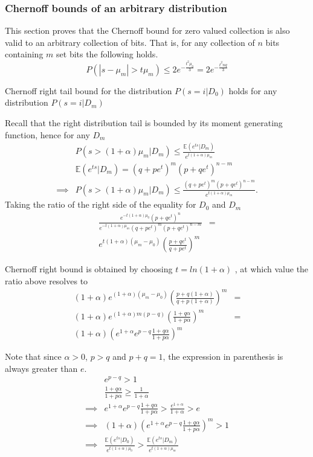 \documentclass[11pt]{article}
\newcommand{\E}{\mathbb{E}} %
\begin{document}
\subsubsection{Chernoff bounds of an arbitrary distribution }

This section proves that the Chernoff bound for zero valued collection is also valid to an arbitrary collection of bits.  That is, for any collection of $n$ bits containing $m$ set bits the following holds.
\[ P(|s - \mu_m| > t\mu_m) \le 2 e^{- \frac{t^2\mu_0}{3}}  = 2 e^{- \frac{t^2nq}{3}} \]

\begin{prop} \label{lem:zleft}
Chernoff right tail bound for the distribution $P(s=i|D_0)$ holds for any distribution $P(s=i|D_m)$
\begin{pf}
Recall that the right distribution tail is bounded by its moment generating function, hence for any $D_m$
 \begin{align}
& P(s  > (1+\alpha)\mu_m | D_m)  \le \frac{\E(e^{ts}|D_m)}{e^{t(1+\alpha)\mu_m}} \\
 & \E(e^{ts}|D_m) = (q +pe^{t})^m(p+qe^{t})^{n-m} \\
 \implies & P(s  > (1+\alpha)\mu_m | D_m)  \le \frac{ (q +pe^{t})^m(p+qe^{t})^{n-m}}{e^{t(1+\alpha)\mu_m}}. \label{eq:cbd}
 \end{align}
 Taking the ratio of the right side of the equality for $D_0$ and $D_m$
 \begin{align}
  \frac{ e^{-t(1+\alpha)\mu_0} (p+qe^{t})^n }{ e^{-t(1+\alpha)\mu_m} (q +pe^{t})^m(p+qe^{t})^{n-m} } & = \\
  e^{t(1+\alpha)(\mu_m - \mu_0)} \left ( \frac{p+qe^{t} } { q+pe^{t} } \right )^m
\end{align}
 
 Chernoff right bound is obtained by choosing $t=ln(1+\alpha)$ , at which value the ratio above resolves to
  \begin{align*}
 (1+\alpha)e^{(1+\alpha)(\mu_m - \mu_0)} \left ( \frac{p+q(1+\alpha) } { q+p(1+\alpha) } \right )^m & = \\
 (1+\alpha)e^{(1+\alpha)m(p - q)} \left ( \frac{1+q\alpha } { 1+ p\alpha} \right )^m  & = \\
  (1+\alpha) \left ( e^{1+\alpha} e^{p-q} \frac{1+q\alpha } { 1+ p\alpha} \right )^m
 \end{align*}
 
Note that since $\alpha > 0$, $p>q$ and $p+q=1$, the expression in parenthesis is always greater than $e$.
  \begin{align*}
 & e^{p-q} > 1 \\
 & \frac{1+q\alpha } { 1+ p\alpha}  \ge \frac{1} { 1+ \alpha}  \\
 \implies & e^{1+\alpha} e^{p-q} \frac{1+q\alpha } { 1+ p\alpha}  > \frac{ e^{1+\alpha} } { 1 + \alpha}  > e \\
 \implies  & (1+\alpha) \left ( e^{1+\alpha} e^{p-q} \frac{1+q\alpha } { 1+ p\alpha} \right )^m > 1 \\
  \implies & \frac{\E(e^{ts}|D_0)}{e^{t(1+\alpha)\mu_0}} > \frac{\E(e^{ts}|D_m)}{e^{t(1+\alpha)\mu_m}}
  \end{align*}
  

\end{pf}
\end{prop}
\end{document}
